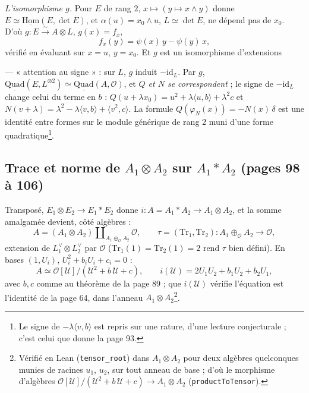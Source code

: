 \documentclass[11pt,a4paper]{article}
\begin{document}
\emph{L'isomorphisme $g$.} Pour $E$ de rang $2$, $x \mapsto (y \mapsto x \wedge y)$ donne
$E \simeq \underline{\mathrm{Hom}}(E, \det E)$, et $\alpha(u) = x_0 \wedge u$, $L \simeq \det E$,
ne dépend pas de $x_0$. D'où $g : E \xrightarrow{\sim} A \otimes L$, $g(x) = f_x$,
\[
  f_x(y) = \psi(x)\,y - \psi(y)\,x ,
\]
vérifié en évaluant sur $x = u$, $y = x_0$. Et $g$ est un isomorphisme d'extensions


--- « attention au signe » : sur $L$, $g$ induit $-\mathrm{id}_L$. Par $g$,
$\underline{\mathrm{Quad}}(E, L^{\otimes 2}) \simeq \underline{\mathrm{Quad}}(A, \mathcal{O})$,
et \emph{$Q$ et $N$ se correspondent} ; le signe de $-\mathrm{id}_L$ change celui du
terme en $b$ : $Q(u + \lambda x_0) = u^{2} + \lambda\langle u, b\rangle + \lambda^{2}c$ et
$N(v + \lambda) = \lambda^{2} - \lambda\langle v, b\rangle + \langle v^{2}, c\rangle$. La
formule $Q(\varphi_N(x)) = -N(x)\,\delta$ est une identité entre formes sur le module
générique de rang $2$ muni d'une forme quadratique\footnote{Le signe de
$-\lambda\langle v, b\rangle$ est repris sur une rature, d'une lecture conjecturale ; c'est
celui que donne la page 93.}.

\subsection*{Trace et norme de $A_1 \otimes A_2$ sur $A_1 * A_2$ (pages 98 à 106)}

Transposé, $E_1 \otimes E_2 \to E_1 * E_2$ donne $i : A = A_1 * A_2 \to A_1 \otimes A_2$, et
la somme amalgamée devient, côté algèbres :
\[
  A = (A_1 \otimes A_2) \amalg_{A_1 \oplus_{\mathcal{O}} A_2} \mathcal{O}, \qquad
  \tau = (\mathrm{Tr}_1, \mathrm{Tr}_2) : A_1 \oplus_{\mathcal{O}} A_2 \to \mathcal{O},
\]
extension de $L_1^{\vee} \otimes L_2^{\vee}$ par $\mathcal{O}$ ($\mathrm{Tr}_1(1) = \mathrm{Tr}_2(1)
= 2$ rend $\tau$ bien défini). En bases $(1, U_i)$, $U_i^{2} + b_iU_i + c_i = 0$ :
\[
  A \simeq \mathcal{O}[\mathcal{U}]/(\mathcal{U}^{2} + b\,\mathcal{U} + c), \qquad
  i(\mathcal{U}) = 2U_1U_2 + b_1U_2 + b_2U_1,
\]
avec $b, c$ comme au théorème de la page 89 ; que $i(\mathcal{U})$ vérifie l'équation
est l'identité de la page 64, dans l'anneau $A_1 \otimes A_2$\footnote{Vérifié en
Lean (\texttt{tensor\_root}) dans $A_1 \otimes A_2$ pour deux algèbres quelconques
munies de racines $u_1$, $u_2$, sur tout anneau de base ; d'où le morphisme
d'algèbres $\mathcal{O}[\mathcal{U}]/(\mathcal{U}^{2} + b\,\mathcal{U} + c) \to A_1
\otimes A_2$ (\texttt{productToTensor}).}.
\end{document}
